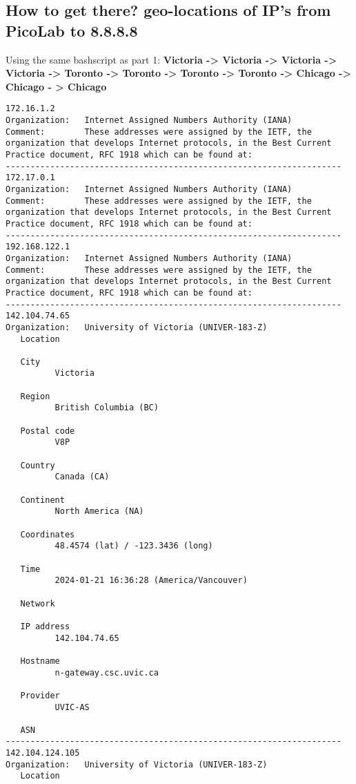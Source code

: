 \documentclass[
	letterpaper, %
	10pt, %
]{CSUniSchoolLabReport}
\begin{document}
\subsection{How to get there? geo-locations of IP's from PicoLab to 8.8.8.8}
Using the same bashscript as part 1:
\textbf{Victoria -> Victoria -> Victoria -> Victoria -> Toronto -> Toronto -> Toronto -> 
Toronto -> Chicago -> Chicago - > Chicago}
\begin{center}
\begin{verbatim}
172.16.1.2
Organization:   Internet Assigned Numbers Authority (IANA)
Comment:        These addresses were assigned by the IETF, the organization that develops Internet protocols, in the Best Current Practice document, RFC 1918 which can be found at:
--------------------------------------------------------------------
172.17.0.1
Organization:   Internet Assigned Numbers Authority (IANA)
Comment:        These addresses were assigned by the IETF, the organization that develops Internet protocols, in the Best Current Practice document, RFC 1918 which can be found at:
--------------------------------------------------------------------
192.168.122.1
Organization:   Internet Assigned Numbers Authority (IANA)
Comment:        These addresses were assigned by the IETF, the organization that develops Internet protocols, in the Best Current Practice document, RFC 1918 which can be found at:
--------------------------------------------------------------------
142.104.74.65
Organization:   University of Victoria (UNIVER-183-Z)
   Location

   City
          Victoria

   Region
          British Columbia (BC)

   Postal code
          V8P

   Country
          Canada (CA)

   Continent
          North America (NA)

   Coordinates
          48.4574 (lat) / -123.3436 (long)

   Time
          2024-01-21 16:36:28 (America/Vancouver)

   Network

   IP address
          142.104.74.65

   Hostname
          n-gateway.csc.uvic.ca

   Provider
          UVIC-AS

   ASN
--------------------------------------------------------------------
142.104.124.105
Organization:   University of Victoria (UNIVER-183-Z)
   Location


\end{verbatim}
\end{center}
\end{document}
